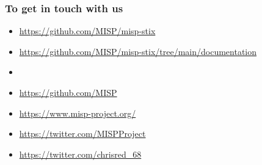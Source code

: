 \begin{frame}
    \frametitle{To get in touch with us}
    \begin{itemize}
        \item \url{https://github.com/MISP/misp-stix}
        \item \url{https://github.com/MISP/misp-stix/tree/main/documentation}
        \item []
        \item \url{https://github.com/MISP}
        \item \url{https://www.misp-project.org/}
        \item \url{https://twitter.com/MISPProject}
        \item \url{https://twitter.com/chrisred_68}
    \end{itemize}
\end{frame}
